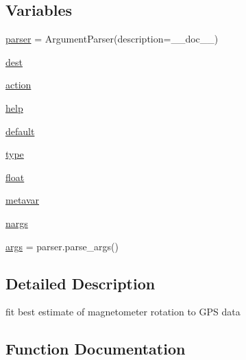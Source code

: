 \subsection*{Variables}
\begin{DoxyCompactItemize}
\item 
\mbox{\hyperlink{namespacepymavlink_1_1tools_1_1magfit__rotation__gps_a428a13eb926699f2a21c646f932abe87}{parser}} = Argument\+Parser(description=\+\_\+\+\_\+doc\+\_\+\+\_\+)
\item 
\mbox{\hyperlink{namespacepymavlink_1_1tools_1_1magfit__rotation__gps_afaf127ac28c903fb18314938ec0f59a1}{dest}}
\item 
\mbox{\hyperlink{namespacepymavlink_1_1tools_1_1magfit__rotation__gps_a2317bac69bbddd888f5ad8d03ea7ecce}{action}}
\item 
\mbox{\hyperlink{namespacepymavlink_1_1tools_1_1magfit__rotation__gps_aff6395a9045de76470c0963001156966}{help}}
\item 
\mbox{\hyperlink{namespacepymavlink_1_1tools_1_1magfit__rotation__gps_ac19614925535ea788283ac619a889d9a}{default}}
\item 
\mbox{\hyperlink{namespacepymavlink_1_1tools_1_1magfit__rotation__gps_a61985719996fb8a202a94859c3440059}{type}}
\item 
\mbox{\hyperlink{namespacepymavlink_1_1tools_1_1magfit__rotation__gps_a1ce20c7769670131a8c44840a4ff00b8}{float}}
\item 
\mbox{\hyperlink{namespacepymavlink_1_1tools_1_1magfit__rotation__gps_a8ea8d5b66514c164d1ae88732aa37837}{metavar}}
\item 
\mbox{\hyperlink{namespacepymavlink_1_1tools_1_1magfit__rotation__gps_ad7b88328804d94afb41eb71573f293ac}{nargs}}
\item 
\mbox{\hyperlink{namespacepymavlink_1_1tools_1_1magfit__rotation__gps_a546c94a82143c99db429ae0da7b23f1e}{args}} = parser.\+parse\+\_\+args()
\end{DoxyCompactItemize}


\subsection{Detailed Description}
\begin{DoxyVerb}fit best estimate of magnetometer rotation to GPS data
\end{DoxyVerb}
 

\subsection{Function Documentation}
\mbox{\label{namespacepymavlink_1_1tools_1_1magfit__rotation__gps_a07a846988f01406b07262b59f194bc0c}} 
